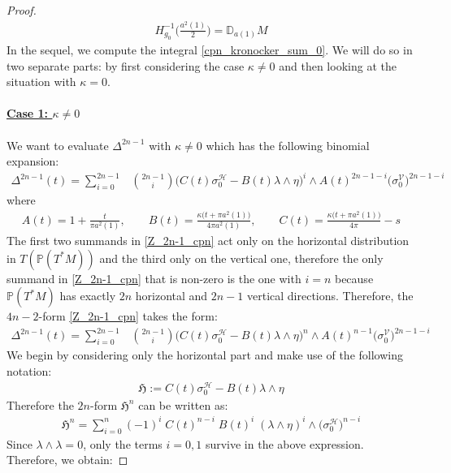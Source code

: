 \documentclass[11pt]{amsart}
\theoremstyle{plain}
\theoremstyle{definition}
\theoremstyle{remark}
\begin{document}
\begin{proof}
\begin{align}
    H^{-1}_{g_0}\Big( \frac{a^2(1)}{2}\Big) = \mathbb{D}_{a(1)}M
\end{align}
In the sequel, we compute the integral \eqref{cpn_kronocker_sum_0}. We will do so in two separate parts: by first considering the case $\kappa \neq 0$ and then looking at the situation with $\kappa =0$.\\
\\
\textbf{\underline{Case 1: $\kappa \neq 0$}}\\
\\
We want to evaluate $\Delta^{2n-1}$ with $\kappa \neq
 0$ which has the following binomial expansion:
\begin{align}\label{Z_2n-1_cpn}
   \Delta^{2n-1} (t) = \sum^{2n-1}_{i=0} & \binom{2n-1}{i} \Big( C(t) \sigma^{\mathcal{H}}_0 - B(t)\lambda\wedge\eta  \Big)^{i}  \wedge A(t)^{2n-1-i} \big(\sigma^{\mathcal{V}}_{0}\big)^{2n-1-i}
\end{align}
where 
\begin{align}
    A(t)=1+\frac{t}{\pi a^2(1)},\qquad
B(t)=\frac{\kappa\bigl(t+\pi a^2(1)\bigr)}{4\pi a^2(1)},\qquad
C(t)=\frac{\kappa\bigl(t+\pi a^2(1)\bigr)}{4\pi}-s
\end{align}
The first two summands in  \eqref{Z_2n-1_cpn} act only on the horizontal distribution in $T(\mathbb{P}(T^*M))$ and the third only on the vertical one, therefore the only summand in \eqref{Z_2n-1_cpn} that is non-zero is the one with $i=n$ because $\mathbb{P}(T^*M)$ has exactly $2n$ horizontal and $2n-1$ vertical directions. Therefore, the $4n-2$-form \eqref{Z_2n-1_cpn} takes the form: \begin{align}\label{cpn_kronocker_sum_3}
 \Delta^{2n-1} (t) = \sum^{2n-1}_{i=0} & \binom{2n-1}{i} \Big( C(t) \sigma^{\mathcal{H}}_0 - B(t)\lambda\wedge\eta  \Big)^{n}  \wedge A(t)^{n-1} \big(\sigma^{\mathcal{V}}_{0}\big)^{2n-1-i}
\end{align}
We begin by considering only the horizontal part and make use of the following notation:
\begin{align}\label{H_def_without_power}
    \mathfrak{H}:=  C(t) \sigma^{\mathcal{H}}_0 - B(t)\lambda\wedge\eta  
\end{align}
Therefore the $2n$-form $\mathfrak{H}^n$ can be written as:
\begin{align}
    \mathfrak{H}^n = \sum^n_{i=0} (-1)^{i}\; C(t)^{n-i}\;B(t)^{i}\;(\lambda\wedge\eta)^i \wedge \Big(\sigma^{\mathcal{H}}_0\Big)^{n-i}
\end{align}
Since $\lambda \wedge \lambda =0$, only the terms $i=0,1$ survive in the above expression. Therefore, we obtain:

\end{proof}
\end{document}
